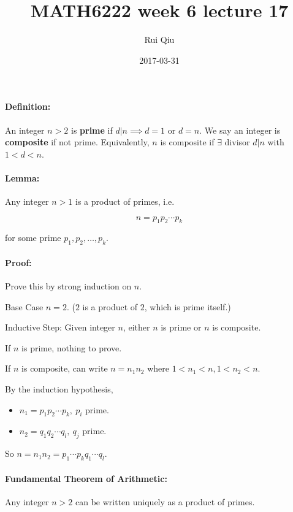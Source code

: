 \documentclass[a4paper, 11pt, twoside]{article}
\begin{document}
\title{MATH6222 week 6 lecture 17}
\author{Rui Qiu}
\date{2017-03-31}

\maketitle

\paragraph{Definition:} An integer $n > 2$ is \textbf{prime} if $d|n\implies d=1$ or $d=n$. We say an integer is \textbf{composite} if not prime. Equivalently, $n$ is composite if $\exists$ divisor $d|n$ with $1< d < n$.\\

\paragraph{Lemma:} Any integer $n>1$ is a product of primes, i.e.

\[n=p_1p_2\cdots p_k\]

for some prime $p_1,p_2,\dots, p_k.$\\

\paragraph{Proof:} Prove this by strong induction on $n$.

Base Case $n=2$. ($2$ is a product of $2$, which is prime itself.)

Inductive Step: Given integer $n$, either $n$ is prime or $n$ is composite.

If $n$ is prime, nothing to prove.

If $n$ is composite, can write $n=n_1n_2$ where $1 < n_1 < n, 1< n_2 < n.$

By the induction hypothesis, 

\begin{itemize}
	\item $n_1=p_1p_2\cdots p_k,\ p_i$ prime.
	\item $n_2=q_1q_2\cdots q_l,\ q_j$ prime.
\end{itemize}

So $n=n_1n_2=p_1\cdots p_kq_1\cdots q_l.$\\

\paragraph{Fundamental Theorem of Arithmetic:} Any integer $n>2$ can be written uniquely as a product of primes.
\end{document}
